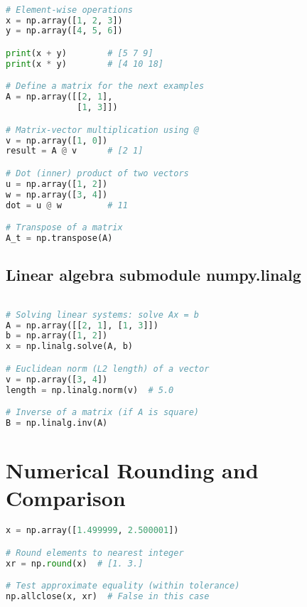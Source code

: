 \documentclass{article}
\begin{document}
\begin{lstlisting}[language=Python]

# Element-wise operations
x = np.array([1, 2, 3])
y = np.array([4, 5, 6])

print(x + y)        # [5 7 9]
print(x * y)        # [4 10 18]

# Define a matrix for the next examples
A = np.array([[2, 1], 
              [1, 3]])

# Matrix-vector multiplication using @
v = np.array([1, 0])
result = A @ v      # [2 1]

# Dot (inner) product of two vectors
u = np.array([1, 2])
w = np.array([3, 4])
dot = u @ w         # 11

# Transpose of a matrix
A_t = np.transpose(A)

\end{lstlisting}


\subsection*{Linear algebra submodule numpy.linalg}

\begin{lstlisting}[language=Python]

# Solving linear systems: solve Ax = b
A = np.array([[2, 1], [1, 3]])
b = np.array([1, 2])
x = np.linalg.solve(A, b)

# Euclidean norm (L2 length) of a vector
v = np.array([3, 4])
length = np.linalg.norm(v)  # 5.0

# Inverse of a matrix (if A is square)
B = np.linalg.inv(A)

\end{lstlisting}

\section{Numerical Rounding and Comparison}

\begin{lstlisting}[language=Python]
x = np.array([1.499999, 2.500001])

# Round elements to nearest integer
xr = np.round(x)  # [1. 3.]

# Test approximate equality (within tolerance)
np.allclose(x, xr)  # False in this case
\end{lstlisting}
\end{document}
